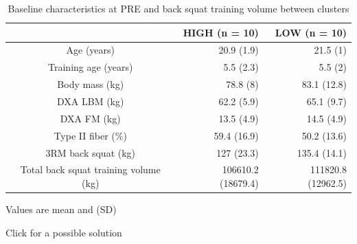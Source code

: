\documentclass[
  11pt,
  letterpaper,
]{scrbook}
\begin{document}
\setlength{\LTpost}{0mm}
\begin{longtable}{crr}
\caption{Baseline characteristics at PRE and back squat training volume between
clusters}\tabularnewline

\toprule
  & HIGH (n = 10) & LOW (n = 10) \\ 
\midrule
Age (years) & 20.9 (1.9) & 21.5 (1) \\ 
Training age (years) & 5.5 (2.3) & 5.5 (2) \\ 
Body mass (kg) & 78.8 (8) & 83.1 (12.8) \\ 
DXA LBM (kg) & 62.2 (5.9) & 65.1 (9.7) \\ 
DXA FM (kg) & 13.5 (4.9) & 14.5 (4.9) \\ 
Type II fiber (\%) & 59.4 (16.9) & 50.2 (13.6) \\ 
3RM back squat (kg) & 127 (23.3) & 135.4 (14.1) \\ 
Total back squat training volume (kg) & 106610.2 (18679.4) & 111820.8 (12962.5) \\ 
\bottomrule
\end{longtable}
\begin{minipage}{\linewidth}
Values are mean and (SD)\\
\end{minipage}

Click for a possible solution
\end{document}
